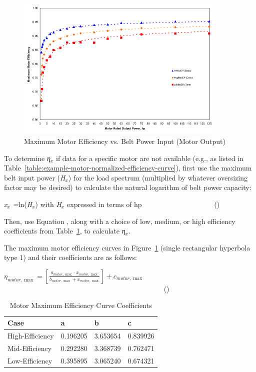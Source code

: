 \begin{figure}[hbtp] %
\centering
\includegraphics[width=0.9\textwidth, height=0.9\textheight, keepaspectratio=true]{media/image4917.svg.png}
\caption{Maximum Motor Efficiency vs. Belt Power Input (Motor Output) \protect \label{fig:maximum-motor-efficiency-vs.-belt-power-input}}
\end{figure}

To determine \emph{η\(_{x}\)} if data for a specific motor are not available (e.g., as listed in Table~\ref{table:example-motor-normalized-efficiency-curve}), first use the maximum belt input power (\emph{H\(_{x}\)}) for the load spectrum (multiplied by whatever oversizing factor may be desired) to calculate the natural logarithm of belt power capacity:

\emph{x\(_{x}\) =}ln(\emph{H\(_{x}\)}) with \emph{H\(_{x}\)} expressed in terms of hp~~~~~~~~~~~~~~~~~~~~ ()

Then, use Equation , along with a choice of low, medium, or high efficiency coefficients from Table~\ref{table:motor-maximum-efficiency-curve-coefficients}, to calculate \emph{η\(_{x}\)}.

The maximum motor efficiency curves in Figure~\ref{fig:maximum-motor-efficiency-vs.-belt-power-input} (single rectangular hyperbola type 1) and their coefficients are as follows:

\({\eta_{motor,\max }} = \left[ {\frac{{{a_{motor,\max }} \cdot {x_{motor,\max }}}}{{{b_{motor,\max }} + {x_{motor,\max }}}}} \right] + {c_{motor,\max }}\) ~~~~~~~~~~~~~~~~~~~~~~~~~~~~~~~~~~~~~~~~~~~~~ ()

\begin{longtable}[c]{@{}llll@{}}
\caption{Motor Maximum Efficiency Curve Coefficients \protect \label{table:motor-maximum-efficiency-curve-coefficients}}\\
\toprule 
Case & a & b & c \tabularnewline \midrule
\endhead
High-Efficiency & 0.196205 & 3.653654 & 0.839926 \tabularnewline
Mid-Efficiency & 0.292280 & 3.368739 & 0.762471 \tabularnewline
Low-Efficiency & 0.395895 & 3.065240 & 0.674321 \tabularnewline
\bottomrule
\end{longtable}

